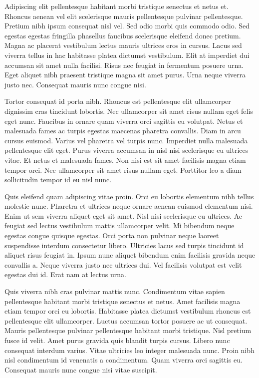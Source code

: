 \documentclass[11pt,a4paper]{article}
\begin{document}
Adipiscing elit pellentesque habitant morbi tristique senectus et netus et. Rhoncus aenean vel elit scelerisque mauris pellentesque pulvinar pellentesque. Pretium nibh ipsum consequat nisl vel. Sed odio morbi quis commodo odio. Sed egestas egestas fringilla phasellus faucibus scelerisque eleifend donec pretium. Magna ac placerat vestibulum lectus mauris ultrices eros in cursus. Lacus sed viverra tellus in hac habitasse platea dictumst vestibulum. Elit at imperdiet dui accumsan sit amet nulla facilisi. Risus nec feugiat in fermentum posuere urna. Eget aliquet nibh praesent tristique magna sit amet purus. Urna neque viverra justo nec. Consequat mauris nunc congue nisi.

Tortor consequat id porta nibh. Rhoncus est pellentesque elit ullamcorper dignissim cras tincidunt lobortis. Nec ullamcorper sit amet risus nullam eget felis eget nunc. Faucibus in ornare quam viverra orci sagittis eu volutpat. Netus et malesuada fames ac turpis egestas maecenas pharetra convallis. Diam in arcu cursus euismod. Varius vel pharetra vel turpis nunc. Imperdiet nulla malesuada pellentesque elit eget. Purus viverra accumsan in nisl nisi scelerisque eu ultrices vitae. Et netus et malesuada fames. Non nisi est sit amet facilisis magna etiam tempor orci. Nec ullamcorper sit amet risus nullam eget. Porttitor leo a diam sollicitudin tempor id eu nisl nunc.

Quis eleifend quam adipiscing vitae proin. Orci eu lobortis elementum nibh tellus molestie nunc. Pharetra et ultrices neque ornare aenean euismod elementum nisi. Enim ut sem viverra aliquet eget sit amet. Nisl nisi scelerisque eu ultrices. Ac feugiat sed lectus vestibulum mattis ullamcorper velit. Mi bibendum neque egestas congue quisque egestas. Orci porta non pulvinar neque laoreet suspendisse interdum consectetur libero. Ultricies lacus sed turpis tincidunt id aliquet risus feugiat in. Ipsum nunc aliquet bibendum enim facilisis gravida neque convallis a. Neque viverra justo nec ultrices dui. Vel facilisis volutpat est velit egestas dui id. Erat nam at lectus urna.

Quis viverra nibh cras pulvinar mattis nunc. Condimentum vitae sapien pellentesque habitant morbi tristique senectus et netus. Amet facilisis magna etiam tempor orci eu lobortis. Habitasse platea dictumst vestibulum rhoncus est pellentesque elit ullamcorper. Luctus accumsan tortor posuere ac ut consequat. Mauris pellentesque pulvinar pellentesque habitant morbi tristique. Nisl pretium fusce id velit. Amet purus gravida quis blandit turpis cursus. Libero nunc consequat interdum varius. Vitae ultricies leo integer malesuada nunc. Proin nibh nisl condimentum id venenatis a condimentum. Quam viverra orci sagittis eu. Consequat mauris nunc congue nisi vitae suscipit.
\end{document}
